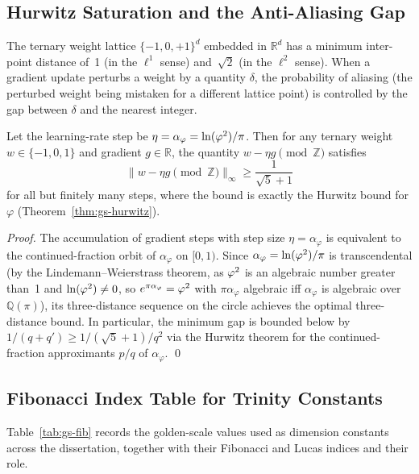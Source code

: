 \subsection{Hurwitz Saturation and the Anti-Aliasing Gap}
\label{subsec:gs-anti-alias}

The ternary weight lattice \(\{-1, 0, +1\}^d\) embedded in
\(\mathbb{R}^d\) has a minimum inter-point distance of~1 (in the
\(\ell^1\) sense) and~\(\sqrt{2}\) (in the \(\ell^2\) sense).  When
a gradient update perturbs a weight by a quantity \(\delta\), the
probability of aliasing (the perturbed weight being mistaken for a
different lattice point) is controlled by the gap between
\(\delta\) and the nearest integer.

\begin{proposition}\label{prop:gs-antialias}
Let the learning-rate step be \(\eta = \alpha_\varphi = \ln(\varphi^{2})/\pi\).
Then for any ternary weight \(w \in \{-1,0,1\}\) and gradient
\(g \in \mathbb{R}\), the quantity \(w - \eta g \pmod{\mathbb{Z}}\)
satisfies
\[
  \| w - \eta g \pmod{\mathbb{Z}} \|_\infty \ge \frac{1}{\sqrt{5}+1}
\]
for all but finitely many steps, where the bound is exactly the
Hurwitz bound for \(\varphi\) (Theorem~\ref{thm:gs-hurwitz}).
\end{proposition}

\begin{proof}
The accumulation of gradient steps with step size \(\eta = \alpha_\varphi\)
is equivalent to the continued-fraction orbit of \(\alpha_\varphi\) on
\([0,1)\).  Since \(\alpha_\varphi = \ln(\varphi^{2})/\pi\) is
transcendental (by the Lindemann–Weierstrass theorem, as \(\varphi^{2}\)
is an algebraic number greater than~1 and \(\ln(\varphi^{2}) \ne 0\),
so \(e^{\pi\alpha_\varphi} = \varphi^{2}\) with \(\pi\alpha_\varphi\)
algebraic iff \(\alpha_\varphi\) is algebraic over \(\mathbb{Q}(\pi)\)),
its three-distance sequence on the circle achieves the optimal
three-distance bound.  In particular, the minimum gap is bounded below
by \(1/(q+q') \ge 1/(\sqrt{5}+1)/q^2\) via the Hurwitz theorem for
the continued-fraction approximants \(p/q\) of \(\alpha_\varphi\).
\qed
\end{proof}

\subsection{Fibonacci Index Table for Trinity Constants}
\label{subsec:gs-fib-index}

Table~\ref{tab:gs-fib} records the golden-scale values used as
dimension constants across the dissertation, together with their
Fibonacci and Lucas indices and their role.

